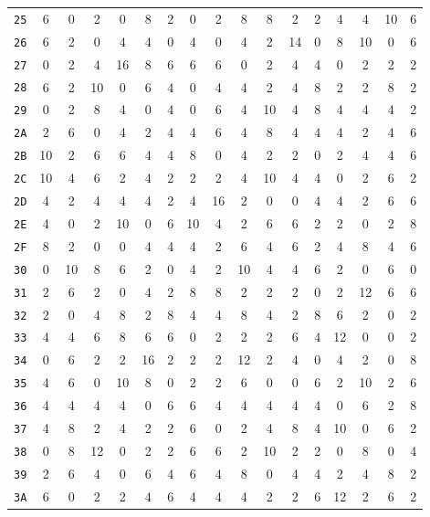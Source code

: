 \begin{center}
\begin{small}
\begin{longtable}{c|cccccccccccccccc}
\texttt{25} & 6 & 0 & 2 & 0 & 8 & 2 & 0 & 2 & 8 & 8 & 2 & 2 & 4 & 4 & 10 & 6 \\
\texttt{26} & 6 & 2 & 0 & 4 & 4 & 0 & 4 & 0 & 4 & 2 & 14 & 0 & 8 & 10 & 0 & 6 \\
\texttt{27} & 0 & 2 & 4 & 16 & 8 & 6 & 6 & 6 & 0 & 2 & 4 & 4 & 0 & 2 & 2 & 2 \\
\texttt{28} & 6 & 2 & 10 & 0 & 6 & 4 & 0 & 4 & 4 & 2 & 4 & 8 & 2 & 2 & 8 & 2 \\
\texttt{29} & 0 & 2 & 8 & 4 & 0 & 4 & 0 & 6 & 4 & 10 & 4 & 8 & 4 & 4 & 4 & 2 \\
\texttt{2A} & 2 & 6 & 0 & 4 & 2 & 4 & 4 & 6 & 4 & 8 & 4 & 4 & 4 & 2 & 4 & 6 \\
\texttt{2B} & 10 & 2 & 6 & 6 & 4 & 4 & 8 & 0 & 4 & 2 & 2 & 0 & 2 & 4 & 4 & 6 \\
\texttt{2C} & 10 & 4 & 6 & 2 & 4 & 2 & 2 & 2 & 4 & 10 & 4 & 4 & 0 & 2 & 6 & 2 \\
\texttt{2D} & 4 & 2 & 4 & 4 & 4 & 2 & 4 & 16 & 2 & 0 & 0 & 4 & 4 & 2 & 6 & 6 \\
\texttt{2E} & 4 & 0 & 2 & 10 & 0 & 6 & 10 & 4 & 2 & 6 & 6 & 2 & 2 & 0 & 2 & 8 \\
\texttt{2F} & 8 & 2 & 0 & 0 & 4 & 4 & 4 & 2 & 6 & 4 & 6 & 2 & 4 & 8 & 4 & 6 \\
\texttt{30} & 0 & 10 & 8 & 6 & 2 & 0 & 4 & 2 & 10 & 4 & 4 & 6 & 2 & 0 & 6 & 0 \\
\texttt{31} & 2 & 6 & 2 & 0 & 4 & 2 & 8 & 8 & 2 & 2 & 2 & 0 & 2 & 12 & 6 & 6 \\
\texttt{32} & 2 & 0 & 4 & 8 & 2 & 8 & 4 & 4 & 8 & 4 & 2 & 8 & 6 & 2 & 0 & 2 \\
\texttt{33} & 4 & 4 & 6 & 8 & 6 & 6 & 0 & 2 & 2 & 2 & 6 & 4 & 12 & 0 & 0 & 2 \\
\texttt{34} & 0 & 6 & 2 & 2 & 16 & 2 & 2 & 2 & 12 & 2 & 4 & 0 & 4 & 2 & 0 & 8 \\
\texttt{35} & 4 & 6 & 0 & 10 & 8 & 0 & 2 & 2 & 6 & 0 & 0 & 6 & 2 & 10 & 2 & 6 \\
\texttt{36} & 4 & 4 & 4 & 4 & 0 & 6 & 6 & 4 & 4 & 4 & 4 & 4 & 0 & 6 & 2 & 8 \\
\texttt{37} & 4 & 8 & 2 & 4 & 2 & 2 & 6 & 0 & 2 & 4 & 8 & 4 & 10 & 0 & 6 & 2 \\
\texttt{38} & 0 & 8 & 12 & 0 & 2 & 2 & 6 & 6 & 2 & 10 & 2 & 2 & 0 & 8 & 0 & 4 \\
\texttt{39} & 2 & 6 & 4 & 0 & 6 & 4 & 6 & 4 & 8 & 0 & 4 & 4 & 2 & 4 & 8 & 2 \\
\texttt{3A} & 6 & 0 & 2 & 2 & 4 & 6 & 4 & 4 & 4 & 2 & 2 & 6 & 12 & 2 & 6 & 2 \\

\end{longtable}
\end{small}
\end{center}
